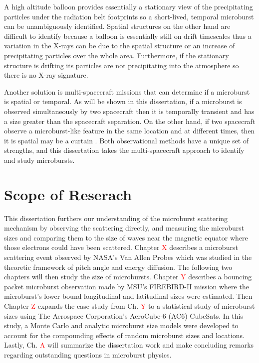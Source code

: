 A high altitude balloon provides essentially a stationary view of the precipitating particles under the radiation belt footprints so a short-lived, temporal microburst can be unambiguously identified. Spatial structures on the other hand are difficult to identify because a balloon is essentially still on drift timescales thus a variation in the X-rays can be due to the spatial structure or an increase of precipitating particles over the whole area. Furthermore, if the stationary structure is drifting its particles are not precipitating into the atmosphere so there is no X-ray signature.

Another solution is multi-spacecraft missions that can determine if a microburst is spatial or temporal. As will be shown in this dissertation, if a microburst is observed simultaneously by two spacecraft then it is temporally transient and has a size greater than the spacecraft separation. On the other hand, if two spacecraft observe a microburst-like feature in the same location and at different times, then it is spatial may be a curtain \citep{Blake2016}. Both observational methods have a unique set of strengths, and this dissertation takes the multi-spacecraft approach to identify and study microbursts.


\section{Scope of Reserach}\label{Intro:scope}
This dissertation furthers our understanding of the microburst scattering mechanism by observing the scattering directly, and measuring the microburst sizes and comparing them to the size of waves near the magnetic equator where those electrons could have been scattered. Chapter \textcolor{red}{X} describes a microburst scattering event observed by NASA's Van Allen Probes which was studied in the theoretic framework of pitch angle and energy diffusion. The following two chapters will then study the size of microbursts. Chapter \textcolor{red}{Y} describes a bouncing packet microburst observation made by MSU's FIREBIRD-II mission where the microburst's lower bound longitudinal and latitudinal sizes were estimated. Then Chapter \textcolor{red}{Z} expands the case study from Ch. \textcolor{red}{Y} to a statistical study of microburst sizes using The Aerospace Corporation's AeroCube-6 (AC6) CubeSats. In this study, a Monte Carlo and analytic microburst size models were developed to account for the compounding effects of random microburst sizes and locations. Lastly, Ch. \textcolor{red}{A} will summarize the dissertation work and make concluding remarks regarding outstanding questions in microburst physics.